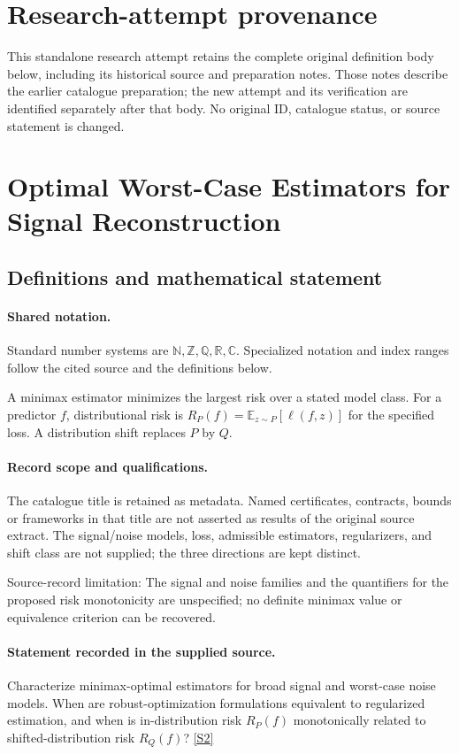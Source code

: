 \documentclass[11pt]{article}
\begin{document}
\section*{Research-attempt provenance}
This standalone research attempt retains the complete original definition body below,
including its historical source and preparation notes. Those notes describe the
earlier catalogue preparation; the new attempt and its verification are identified
separately after that body. No original ID, catalogue status, or source statement is changed.

\section{Optimal Worst-Case Estimators for Signal Reconstruction}\label{statement}

\subsection{Definitions and mathematical statement}

\paragraph{Shared notation.}Standard number systems are $\mathbb N,\mathbb Z,\mathbb Q,\mathbb R,\mathbb C$. Specialized notation and index ranges follow the cited source and the definitions below.


A minimax estimator minimizes the largest risk over a stated model class. For a predictor $f$, distributional risk is $R_P(f)=\mathbb E_{z\sim P}[\ell(f,z)]$ for the specified loss. A distribution shift replaces $P$ by $Q$.
\paragraph{Record scope and qualifications.}
The catalogue title is retained as metadata. Named certificates, contracts, bounds or frameworks in that title are not asserted as results of the original source extract.
The signal/noise models, loss, admissible estimators, regularizers, and shift class are not supplied; the three directions are kept distinct.

Source-record limitation: The signal and noise families and the quantifiers for the proposed risk monotonicity are unspecified; no definite minimax value or equivalence criterion can be recovered.
\paragraph{Statement recorded in the supplied source.}
Characterize minimax-optimal estimators for broad signal and worst-case noise models. When are robust-optimization formulations equivalent to regularized estimation, and when is in-distribution risk $R_P(f)$ monotonically related to shifted-distribution risk $R_Q(f)$? \href{https://doi.org/10.4171/owr/2022/46}{[S2]}
\end{document}
